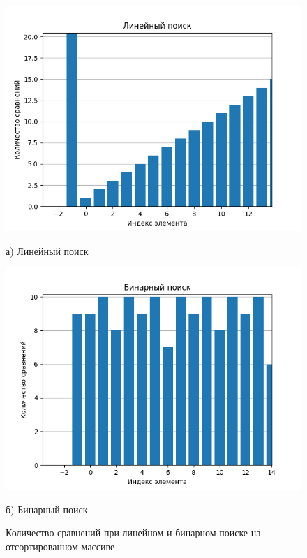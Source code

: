 \begin{figure}[H]
    \centering
    \begin{minipage}[t]{0.48\textwidth}
        \centering
        \includegraphics[width=\linewidth]{img/linear_9.png}
        \caption*{а) Линейный поиск}
    \end{minipage}
    \hfill 
    \begin{minipage}[t]{0.48\textwidth}
        \centering
        \includegraphics[width=\linewidth]{img/binary_9.png}
        \caption*{б) Бинарный поиск}
    \end{minipage}

    \caption{Количество сравнений при линейном и бинарном поиске на отсортированном массиве}
    \label{fig:linear_vs_binary}
\end{figure}

